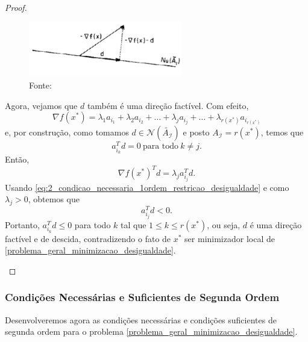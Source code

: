 \documentclass[12pt,a4paper]{scrartcl}
\theoremstyle{definition}%
\begin{document}
\begin{proof}
\begin{enumerate}
\begin{figure}[!h] 
	\centering
	\includegraphics[width=0.60\textwidth]{projecao_sobre_nucleo_teo_condicao_1ordem_desigualdade}
	\caption{Fonte: \textcite{Ana1994} \label{fig:projecao_sobre_nucleo_teo_condicao_1ordem_desigualdade}}
\end{figure}
Agora, vejamos que $d$ também é uma direção factível. Com efeito,
\[
\nabla f(x^{*}) = \lambda_{1} a_{i_{1}} + \lambda_{2} a_{i_{2}} + \ldots + \lambda_{j} a_{i_{j}} + \ldots + \lambda_{r(x^{*})} a_{i_{r(x^{*})}}
\]
e, por construção, como tomamos $d \in \mathcal{N}(\tilde{A_{\mathcal{I}}})$ e posto $A_{\mathcal{I}} = r(x^{*})$, temos que
\[
a_{i_{k}}^{T}d =0 \ \text{para todo} \ k \neq j.
\]
Então,
\[
\nabla f(x^{*})^{T}d = \lambda_{j} a_{i_{j}}^{T} d.
\]
Usando \eqref{eq:2_condicao_necessaria_1ordem_restricao_desigualdade} e como $\lambda_{j} >0$, obtemos que
\[
a_{i_{j}}^{T} d <0.
\]
Portanto, $a_{i_{k}}^{T} d \leq 0$ para todo $k$ tal que $1 \leq k \leq r(x^{*})$, ou seja, $d$ é uma direção factível e de descida, contradizendo o fato de $x^{*}$ ser minimizador local de \eqref{problema_geral_minimizacao_desigualdade}.
\end{enumerate}
\end{proof}



\subsubsection{Condições Necessárias e Suficientes de Segunda Ordem}


Desenvolveremos agora as condições necessárias e condições suficientes de segunda ordem para o problema \eqref{problema_geral_minimizacao_desigualdade}.
\end{document}
